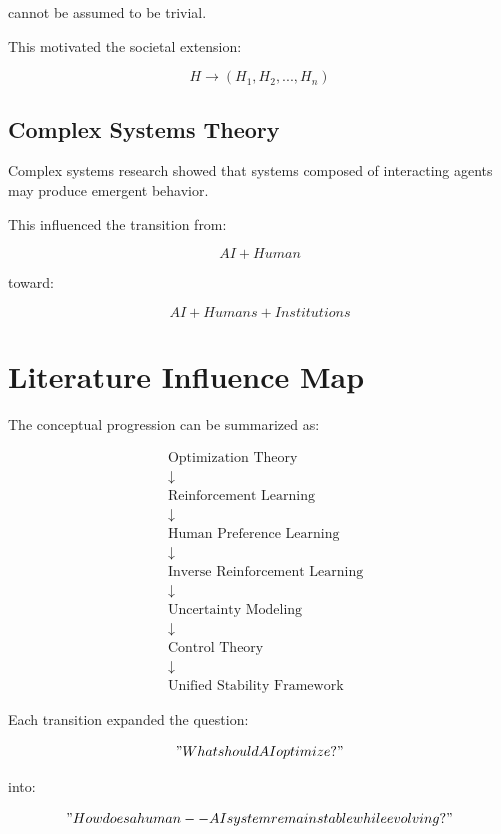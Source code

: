 \documentclass[11pt]{article}
\begin{document}
cannot be assumed to be trivial.


This motivated the societal extension:


\[
H
\rightarrow
(H_1,H_2,...,H_n)
\]



\subsection{Complex Systems Theory}


Complex systems research showed that systems composed of interacting
agents may produce emergent behavior.


This influenced the transition from:


\[
AI+Human
\]


toward:


\[
AI+Humans+Institutions
\]



\section{Literature Influence Map}


The conceptual progression can be summarized as:


\[
\begin{aligned}
&\text{Optimization Theory}
\\
&\downarrow
\\
&\text{Reinforcement Learning}
\\
&\downarrow
\\
&\text{Human Preference Learning}
\\
&\downarrow
\\
&\text{Inverse Reinforcement Learning}
\\
&\downarrow
\\
&\text{Uncertainty Modeling}
\\
&\downarrow
\\
&\text{Control Theory}
\\
&\downarrow
\\
&\text{Unified Stability Framework}
\end{aligned}
\]


Each transition expanded the question:


\[
"What should AI optimize?"
\]


into:


\[
"How does a human--AI system remain stable while evolving?"
\]
\end{document}
